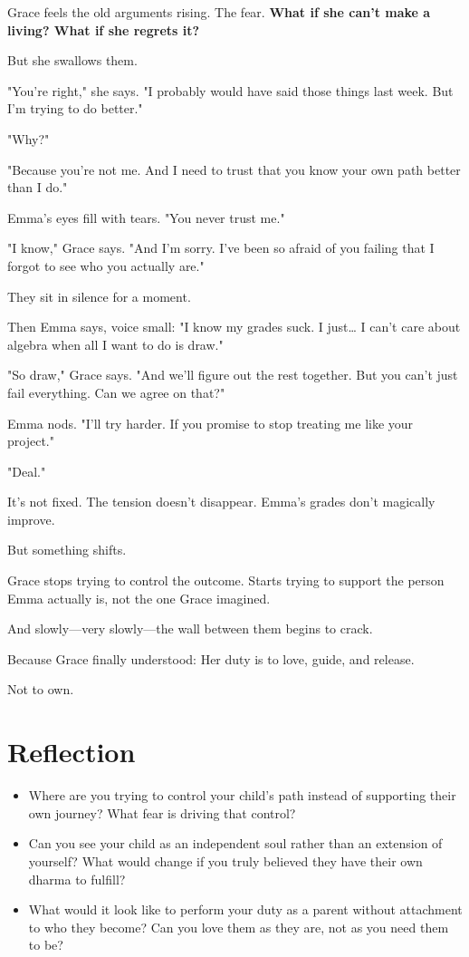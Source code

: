 \documentclass[11pt,twoside]{book}
\begin{document}
Grace feels the old arguments rising. The fear. \textbf{What if she can't make a living? What if she regrets it?}

But she swallows them.

"You're right," she says. "I probably would have said those things last week. But I'm trying to do better."

"Why?"

"Because you're not me. And I need to trust that you know your own path better than I do."

Emma's eyes fill with tears. "You never trust me."

"I know," Grace says. "And I'm sorry. I've been so afraid of you failing that I forgot to see who you actually are."

They sit in silence for a moment.

Then Emma says, voice small: "I know my grades suck. I just\ldots{} I can't care about algebra when all I want to do is draw."

"So draw," Grace says. "And we'll figure out the rest together. But you can't just fail everything. Can we agree on that?"

Emma nods. "I'll try harder. If you promise to stop treating me like your project."

"Deal."

It's not fixed. The tension doesn't disappear. Emma's grades don't magically improve.

But something shifts.

Grace stops trying to control the outcome. Starts trying to support the person Emma actually is, not the one Grace imagined.

And slowly—very slowly—the wall between them begins to crack.

Because Grace finally understood: Her duty is to love, guide, and release.

Not to own.

\section*{Reflection}

\begin{itemize}
\item Where are you trying to control your child's path instead of supporting their own journey? What fear is driving that control?
\item Can you see your child as an independent soul rather than an extension of yourself? What would change if you truly believed they have their own dharma to fulfill?
\item What would it look like to perform your duty as a parent without attachment to who they become? Can you love them as they are, not as you need them to be?
\end{itemize}
\end{document}
